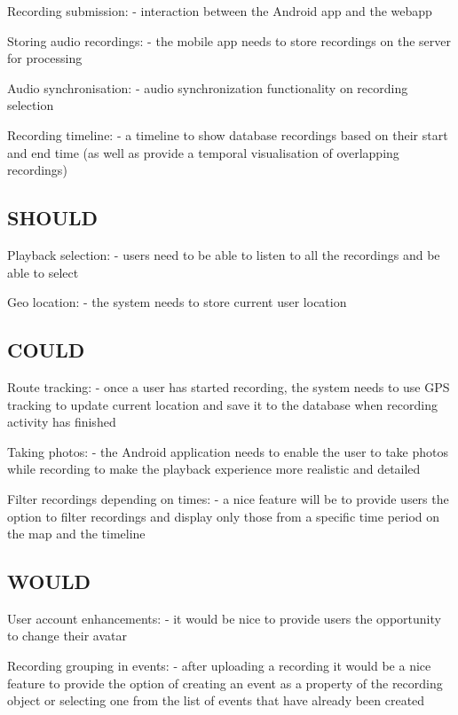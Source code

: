 \documentclass{l3proj}
\begin{document}
		Recording submission:
			- interaction between the Android app and the webapp

		Storing audio recordings:
			- the mobile app needs to store recordings on the server for processing

		Audio synchronisation:
			- audio synchronization functionality on recording selection

		Recording timeline:
			- a timeline to show database recordings based on their start and end time (as well as provide a temporal visualisation of overlapping recordings)

	\subsection{SHOULD}

		Playback selection:
			- users need to be able to listen to all the recordings and be able to select

		Geo location:
			- the system needs to store current user location


	\subsection{COULD}

		Route tracking:
			- once a user has started recording, the system needs to use GPS tracking to update current location and save it to the database when recording activity has finished

		Taking photos:
			- the Android application needs to enable the user to take photos while recording to make the playback experience more realistic and detailed

		Filter recordings depending on times:
			- a nice feature will be to provide users the option to filter recordings and display only those from a specific time period on the map and the timeline

	\subsection{WOULD}

		User account enhancements:
			- it would be nice to provide users the opportunity to change their avatar

		Recording grouping in events:
			- after uploading a recording it would be a nice feature to provide the option of creating an event as a property of the recording object or selecting one from the list of events that have already been created
\end{document}
